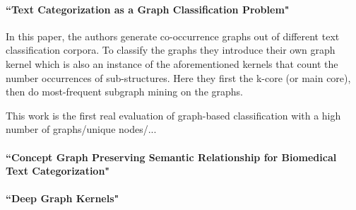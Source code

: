\paragraph{``Text Categorization as a Graph Classification Problem" \cite{Rousseau2015a}}
In this paper, the authors generate co-occurrence graphs out of different text classification corpora.
To classify the graphs they introduce their own graph kernel which is also an instance of the aforementioned kernels that count the number occurrences of sub-structures.
Here they first the k-core (or main core), then do most-frequent subgraph mining on the graphs.

This work is the first real evaluation of graph-based classification with a high number of graphs/unique nodes/...

\paragraph{``Concept Graph Preserving Semantic Relationship for Biomedical Text Categorization" \cite{Gulrandhe2015}}
\paragraph{``Deep Graph Kernels" \cite{Yanardag2015}}
